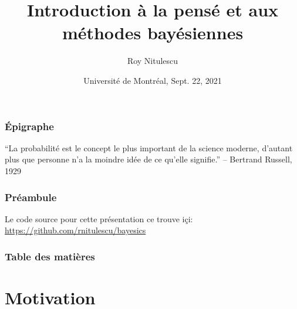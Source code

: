 \documentclass{beamer}
\title{Introduction à la pensé et aux méthodes bayésiennes}
\author{Roy Nitulescu\inst{1}}
\institute
{
    \inst{1}%
    CITADEL\\
    CR-CHUM
}
\date[UdeM, Sept. 22, 2021]{Université de Montréal, Sept. 22, 2021}
\begin{document}

\frame{\titlepage}

\begin{frame}
    \frametitle{Épigraphe}
    ``La probabilité est le concept le plus important de la science moderne,
    d'autant plus que personne n'a la moindre idée de ce qu'elle signifie.'' -- Bertrand Russell, 1929
\end{frame}


\begin{frame}
    \frametitle{Préambule}
    
    
    Le code source pour cette présentation ce trouve içi:\\
    \url{https://github.com/rnitulescu/bayesics}
\end{frame}


\begin{frame}
    \frametitle{Table des matières}
    \tableofcontents
\end{frame}



\section{Motivation}
\end{document}
